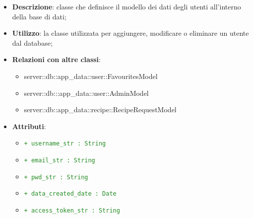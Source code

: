 			\begin{itemize}
				\item \textbf{Descrizione}: classe che definisce il modello dei dati degli utenti all'interno della base di dati;
				\item \textbf{Utilizzo}: la classe utilizzata per aggiungere, modificare o eliminare un utente dal database;
				\item \textbf{Relazioni con altre classi}:
					\begin{itemize}
						\item server::db::app\_data::user::FavouritesModel
						\item server::db:::app\_data::user::AdminModel
						\item server::db::app\_data::recipe::RecipeRequestModel
					\end{itemize}
				\item \textbf{Attributi}:
					\begin{itemize}
						\item \textcolor{forestgreen}{\texttt{+ username\_str : String}}
						\item \textcolor{forestgreen}{\texttt{+ email\_str : String}}
						\item \textcolor{forestgreen}{\texttt{+ pwd\_str : String}}
						\item \textcolor{forestgreen}{\texttt{+ data\_created\_date : Date}}
						\item \textcolor{forestgreen}{\texttt{+ access\_token\_str : String}}
\end{itemize}
\end{itemize}
